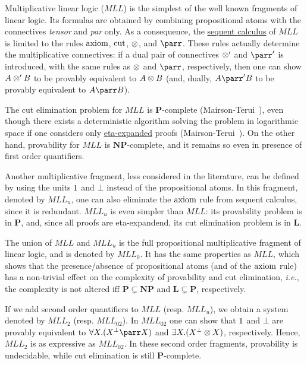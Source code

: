 Multiplicative linear logic (\(MLL\)) is the simplest of the well known
fragments of linear logic. Its formulas are obtained by combining
propositional atoms with the connectives \emph{tensor} and \emph{par}
only. As a consequence, the
\hyperref[sequents-and-proofs]{sequent calculus} of
\(MLL\) is limited to the rules \(\operatorname{axiom}\),
\(\operatorname{cut}\), \(\otimes\), and \(\parr\). These rules actually
determine the multiplicative connectives: if a dual pair of connectives
\(\otimes'\) and \(\parr'\) is introduced, with the same rules as
\(\otimes\) and \(\parr\), respectively, then one can show \(A\otimes' B\)
to be provably equivalent to \(A\otimes B\) (and, dually, \(A\parr'B\) to
be provably equivalent to \(A\parr B\)).

The cut elimination problem for \(MLL\) is \(\mathbf P\)-complete
(Mairson-Terui~\cite{cutelimcomplexity}), even though there exists a deterministic algorithm
solving the problem in logarithmic space if one considers only
\hyperref[expansion-of-identities]{eta-expanded} proofs
(Mairson-Terui~\cite{cutelimcomplexity}). On the other hand, provability for \(MLL\) is
\(\mathbf{NP}\)-complete, and it remains so even in presence of first
order quantifiers.

Another multiplicative fragment, less considered in the literature, can
be defined by using the units \(1\) and \(\bot\) instead of the
propositional atoms. In this fragment, denoted by \(MLL_u\), one can
also eliminate the \(\operatorname{axiom}\) rule from sequent calculus,
since it is redundant. \(MLL_u\) is even simpler than \(MLL\): its
provability problem is in \(\mathbf P\), and, since all proofs are
eta-expandend, its cut elimination problem is in \(\mathbf L\).

The union of \(MLL\) and \(MLL_u\) is the full propositional
multiplicative fragment of linear logic, and is denoted by \(MLL_0\). It
has the same properties as \(MLL\), which shows that the
presence/absence of propositional atoms (and of the \(\operatorname{axiom}\)
rule) has a non-trivial effect on the complexity of provability and cut
elimination, \emph{i.e.}, the complexity is not altered iff
\(\mathbf P\subsetneq\mathbf{NP}\) and \(\mathbf L\subsetneq\mathbf P\),
respectively.

If we add second order quantifiers to \(MLL\) (resp. \(MLL_u\)), we
obtain a system denoted by \(MLL_2\) (resp. \(MLL_{02}\)). In
\(MLL_{02}\) one can show that \(1\) and \(\bot\) are provably
equivalent to \(\forall X.(X\orth\parr X)\) and
\(\exists X.(X^\bot\otimes X)\), respectively. Hence, \(MLL_2\) is as
expressive as \(MLL_{02}\). In these second order fragments, provability
is undecidable, while cut elimination is still \(\mathbf P\)-complete.

